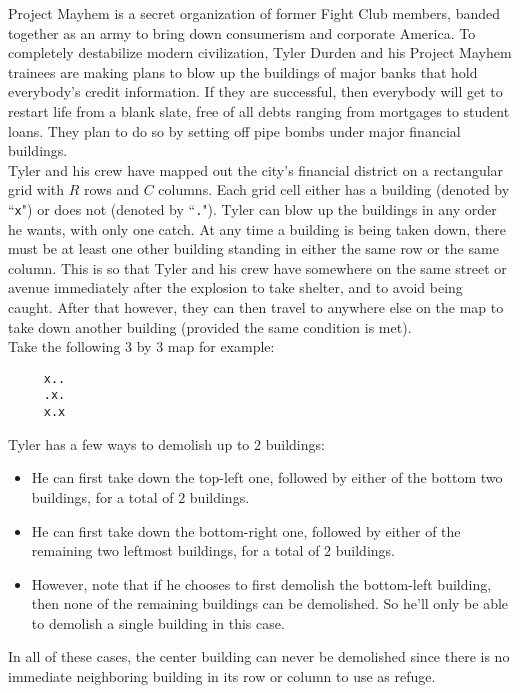 
\noindent Project Mayhem is a secret organization of former Fight Club members, banded together as an army to bring down consumerism and corporate America. To completely destabilize modern civilization, Tyler Durden and his Project Mayhem trainees are making plans to blow up the buildings of major banks that hold everybody's credit information. If they are successful, then everybody will get to restart life from a blank slate, free of all debts ranging from mortgages to student loans. They plan to do so by setting off pipe bombs under major financial buildings.\\

Tyler and his crew have mapped out the city's financial district on a rectangular grid with $R$ rows and $C$ columns. Each grid cell either has a building (denoted by ``\texttt{x}") or does not (denoted by ``\texttt{.}"). Tyler can blow up the buildings in any order he wants, with only one catch. At any time a building is being taken down, there must be at least one other building standing in either the same row or the same column. This is so that Tyler and his crew have somewhere on the same street or avenue immediately after the explosion to take shelter, and to avoid being caught. After that however, they can then travel to anywhere else on the map to take down another building (provided the same condition is met).\\

\noindent Take the following $3$ by $3$ map for example:

\begin{verbatim}
     x..
     .x.
     x.x
\end{verbatim}

\noindent Tyler has a few ways to demolish up to $2$ buildings:
\begin{itemize}
\item He can first take down the top-left one, followed by either of the bottom two buildings, for a total of $2$ buildings.
\item He can first take down the bottom-right one, followed by either of the remaining two leftmost buildings, for a total of $2$ buildings.
\item However, note that if he chooses to first demolish the bottom-left building, then none of the remaining buildings can be demolished. So he'll only be able to demolish a single building in this case.
\end{itemize}
In all of these cases, the center building can never be demolished since there is no immediate neighboring building in its row or column to use as refuge.\\

